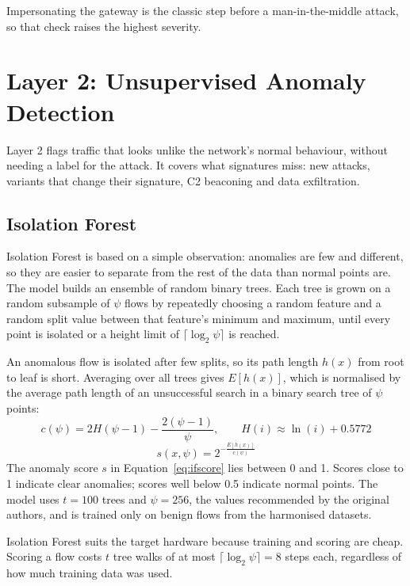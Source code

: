 \noindent Impersonating the gateway is the classic step before a man-in-the-middle attack, so that check raises the highest severity.

\section{Layer 2: Unsupervised Anomaly Detection}\label{sec:5.5}
\label{sec:layer2}
\noindent Layer 2 flags traffic that looks unlike the network's normal behaviour, without needing a label for the attack. It covers what signatures miss: new attacks, variants that change their signature, C2 beaconing and data exfiltration.

\subsection{Isolation Forest}\label{sec:5.5.1}
\label{sec:iforest}
\noindent Isolation Forest \cite{nidps:iforest} is based on a simple observation: anomalies are few and different, so they are easier to separate from the rest of the data than normal points are. The model builds an ensemble of random binary trees. Each tree is grown on a random subsample of $\psi$ flows by repeatedly choosing a random feature and a random split value between that feature's minimum and maximum, until every point is isolated or a height limit of $\lceil \log_2 \psi \rceil$ is reached.

\noindent An anomalous flow is isolated after few splits, so its path length $h(x)$ from root to leaf is short. Averaging over all trees gives $E[h(x)]$, which is normalised by the average path length of an unsuccessful search in a binary search tree of $\psi$ points:
\begin{equation}
\label{eq:cpsi}
c(\psi) = 2H(\psi - 1) - \frac{2(\psi - 1)}{\psi}, \qquad H(i) \approx \ln(i) + 0.5772
\end{equation}
\begin{equation}
\label{eq:ifscore}
s(x, \psi) = 2^{-\frac{E[h(x)]}{c(\psi)}}
\end{equation}
\noindent The anomaly score $s$ in Equation~\ref{eq:ifscore} lies between 0 and 1. Scores close to 1 indicate clear anomalies; scores well below 0.5 indicate normal points. The model uses $t = 100$ trees and $\psi = 256$, the values recommended by the original authors, and is trained only on benign flows from the harmonised datasets.

\noindent Isolation Forest suits the target hardware because training and scoring are cheap. Scoring a flow costs $t$ tree walks of at most $\lceil \log_2 \psi \rceil = 8$ steps each, regardless of how much training data was used.

